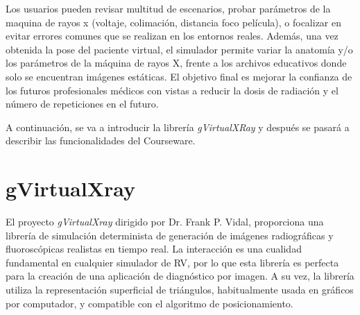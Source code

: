 Los usuarios pueden revisar multitud de escenarios, probar parámetros de la maquina de rayos x (voltaje, colimación, distancia foco película), o focalizar en evitar errores comunes que se realizan en los entornos reales. Además, una vez obtenida la pose del paciente virtual, el simulador permite variar la anatomía y/o los parámetros de la máquina de rayos X, frente a los archivos educativos donde solo se encuentran imágenes estáticas. El objetivo final es mejorar la confianza de los futuros profesionales médicos con vistas a reducir la dosis de radiación y el número de repeticiones en el futuro.%






A continuación, se va a introducir la librería \emph{gVirtualXRay} y después se pasará a describir las funcionalidades del \ac{Courseware}.


\section{gVirtualXray}
\label{xray:context}

El proyecto \emph{gVirtualXray}\cite{sujar:hal} dirigido por Dr. Frank P. Vidal, proporciona una librería de simulación determinista de generación de imágenes radiográficas y fluoroscópicas realistas en tiempo real.%
La interacción es una cualidad fundamental en cualquier simulador de \ac{RV}, por lo que esta librería es perfecta para la creación de una aplicación de diagnóstico por imagen. 
A su vez, la librería utiliza la representación superficial de triángulos, habitualmente usada en gráficos por computador, y compatible con el algoritmo de posicionamiento.

